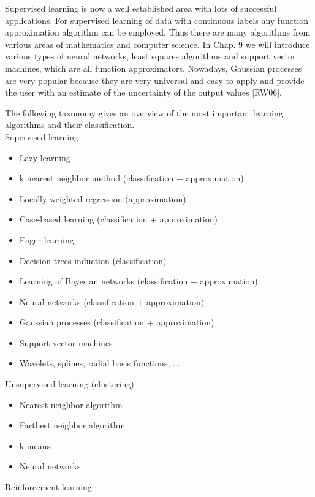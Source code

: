\documentclass[10pt]{article}
\begin{document}
Supervised learning is now a well established area with lots of successful applications. For supervised learning of data with continuous labels any function approximation algorithm can be employed. Thus there are many algorithms from various areas of mathematics and computer science. In Chap. 9 we will introduce various types of neural networks, least squares algorithms and support vector machines, which are all function approximators. Nowadays, Gaussian processes are very popular because they are very universal and easy to apply and provide the user with an estimate of the uncertainty of the output values [RW06].

The following taxonomy gives an overview of the most important learning algorithms and their classification.\\

Supervised learning

\begin{itemize}
  \item Lazy learning
  \item k nearest neighbor method (classification + approximation)
  \item Locally weighted regression (approximation)
  \item Case-based learning (classification + approximation)
  \item Eager learning
  \item Decision trees induction (classification)
  \item Learning of Bayesian networks (classification + approximation)
  \item Neural networks (classification + approximation)
  \item Gaussian processes (classification + approximation)
  \item Support vector machines
  \item Wavelets, splines, radial basis functions, ...
\end{itemize}

Unsupervised learning (clustering)

\begin{itemize}
  \item Nearest neighbor algorithm
  \item Farthest neighbor algorithm
  \item k-means
  \item Neural networks
\end{itemize}

Reinforcement learning
\end{document}
